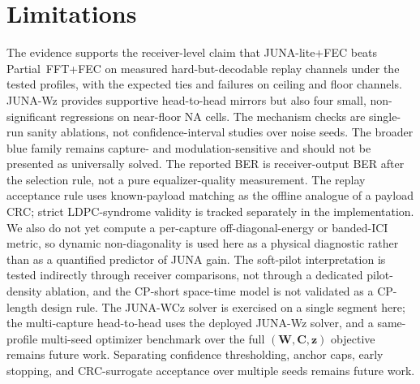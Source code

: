 \documentclass[journal]{IEEEtran}
\newcommand{\juna}{JUNA}
\newcommand{\junalite}{JUNA-lite}
\newcommand{\junawz}{JUNA-Wz}
\newcommand{\junawcz}{JUNA-WCz}
\begin{document}
\clearpage
\section{Limitations}\label{sec:limitations}
The evidence supports the receiver-level claim that \junalite{}+FEC beats
Partial~FFT+FEC on measured hard-but-decodable replay channels under the tested
profiles, with the expected ties and failures on ceiling and floor channels.
\junawz{} provides supportive head-to-head mirrors but also four small,
non-significant regressions on near-floor NA cells. The
mechanism checks are single-run sanity ablations, not confidence-interval studies
over noise seeds. The broader blue family remains capture- and
modulation-sensitive and should not be presented as universally solved. The
reported BER is receiver-output BER after the selection rule, not a pure
equalizer-quality measurement. The replay acceptance rule uses known-payload
matching as the offline analogue of a payload CRC; strict LDPC-syndrome validity
is tracked separately in the implementation. We also do not yet compute a
per-capture off-diagonal-energy or banded-ICI metric, so dynamic non-diagonality
is used here as a physical diagnostic rather than as a quantified predictor of
\juna{} gain. The soft-pilot interpretation is tested indirectly through receiver
comparisons, not through a dedicated pilot-density ablation, and the CP-short
space-time model is not validated as a CP-length design rule. The \junawcz{}
solver is exercised on a single segment here; the multi-capture head-to-head uses
the deployed \junawz{} solver, and a same-profile multi-seed optimizer benchmark
over the full $(\mathbf W,\mathbf C,\mathbf z)$ objective remains future work. Separating
confidence thresholding, anchor
caps, early stopping, and CRC-surrogate acceptance over multiple seeds remains
future work.

\end{document}

